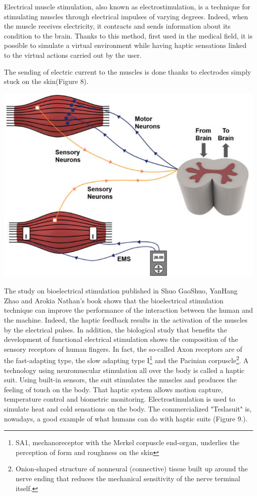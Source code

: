 \documentclass[12pt, a4paper]{article}
\begin{document}
\begin{multicols}{2}
\par Electrical muscle stimulation, also known as electrostimulation, is a technique for stimulating muscles through electrical impulses of varying degrees. Indeed, when the muscle receives electricity, it contracts and sends information about its condition to the brain. Thanks to this method, first used in the medical field, it is possible to simulate a virtual environment while having haptic sensations linked to the virtual actions carried out by the user.
\par The sending of electric current to the muscles is done thanks to electrodes simply stuck on the skin\cite{virtualReal}(Figure 8).\newline

\captionsetup{type=figure}
\includegraphics[width=.49\textwidth]{EMS.png}
\vspace*{3mm}

\par The study on bioelectrical stimulation published in Shuo GaoShuo, YanHang Zhao and Arokia Nathan's book shows that the bioelectrical stimulation technique can improve the performance of the interaction between the human and the machine. Indeed, the haptic feedback results in the activation of the muscles by the electrical pulses. In addition, the biological study that benefits the development of functional electrical stimulation shows the composition of the sensory receptors of human fingers. In fact, the so-called Axon receptors are of the fast-adapting type, the slow adapting type I\footnote{SA1, mechanoreceptor with the Merkel corpuscle end-organ, underlies the perception of form and roughness on the skin} and the Pacinian corpuscle\footnote{Onion-shaped structure of nonneural (connective) tissue built up around the nerve ending that reduces the mechanical sensitivity of the nerve terminal itself.}\cite{TBHMI}.
A technology using neuromuscular stimulation all over the body is called a haptic suit. Using built-in sensors, the suit stimulates the muscles and produces the feeling of touch on the body\cite{hapticexperience}. That haptic system allows motion capture, temperature control and biometric monitoring. Electrostimulation is used to simulate heat and cold sensations on the body. The commercialized "Teslasuit" is, nowadays, a good example of what humans can do with haptic suits\cite{teslasuit} (Figure 9.).\newline


\end{multicols}
\end{document}
